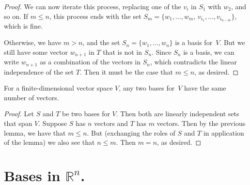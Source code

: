 \begin{proof}
We can now iterate this process, replacing one of the $v_i$ in $S_1$ with $w_2$, and so on.  If $m\leq n$, this process ends with the set $S_m=\{w_1,\ldots, w_m$, $v_{i_1},\ldots,v_{i_{n-m}}  \}$, which is fine.

Otherwise, we have $m>n$, and the set $S_n=\{w_1,\ldots, w_n \}$ is a basis for~$V$.  But we still have some vector 
$w_{n+1}$  in $T$ that is not in $S_n$.  Since $S_n$ is a basis, we can write $w_{n+1}$ as a combination of the vectors in $S_n$, which contradicts the linear independence of the set $T$.  Then it must be the case that $m\leq n$, as desired.
\end{proof}


\begin{corollary}\label{corsame}
For a finite-dimensional vector space $V$, any two bases for~$V$ have the same number of vectors.
\end{corollary}

\begin{proof}
Let $S$ and $T$ be two bases for $V$.  Then both are linearly independent sets that span $V$.  Suppose $S$ has $n$ vectors and $T$ has $m$ vectors.  Then by the previous lemma, we have that $m\leq n$.  But (exchanging the roles of $S$ and $T$ in application of the lemma) we also see that $n\leq m$.  Then $m=n$, as desired.
\end{proof}


\section{Bases in $\mathbb{R}^n$.}

